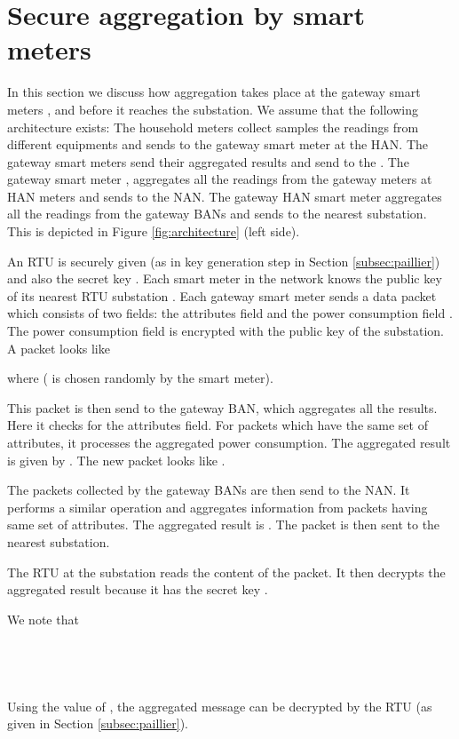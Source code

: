 \documentclass[conference]{IEEEtran}[10pt]
\begin{document}
\section{Secure aggregation by smart meters}
\label{sec:aggregation}
In this section we discuss how aggregation takes place at the gateway smart meters ,  and  
before it reaches the substation. 
We assume that the following architecture exists:
The household meters collect samples the readings from different equipments and sends to the gateway smart meter at the HAN. 
The gateway smart meters  send their aggregated results and send to the . 
The gateway  smart meter , aggregates all the readings from the gateway meters at HAN meters and sends to the NAN. 
The gateway HAN smart meter aggregates all the readings from the gateway BANs  and sends to the nearest substation.  
This is depicted in Figure \ref{fig:architecture} (left side). 

An RTU  is securely given   (as in key generation step in Section \ref{subsec:paillier}) 
and also the secret key .  
Each smart meter in the network knows the public key  of its nearest RTU substation . 
Each gateway smart meter   sends a data packet which consists of two fields: the attributes field  and the power consumption field . 
The power consumption field is encrypted with the public key of the substation. 
A packet looks like 

where  ( is chosen randomly by the smart meter). 

This packet is then send to the gateway BAN,  which aggregates all the results. 
Here it checks for the attributes field. 
For packets which have the same set of attributes, it processes the aggregated power consumption. 
The aggregated result is given by
.  
The new packet looks like .

The packets collected by the gateway BANs are then send to the NAN. 
It performs a similar operation and aggregates information from packets having same set of attributes. 
The aggregated result is 
. 
The packet  is then sent to the nearest substation. 

The RTU  at the substation reads the content of the packet. 
It then decrypts the aggregated result because it has the secret key . 

We note that \\
 \\
\\
	\\
\\
	

Using the value of , the aggregated message can be decrypted by the RTU (as given in Section \ref{subsec:paillier}).
\end{document}
